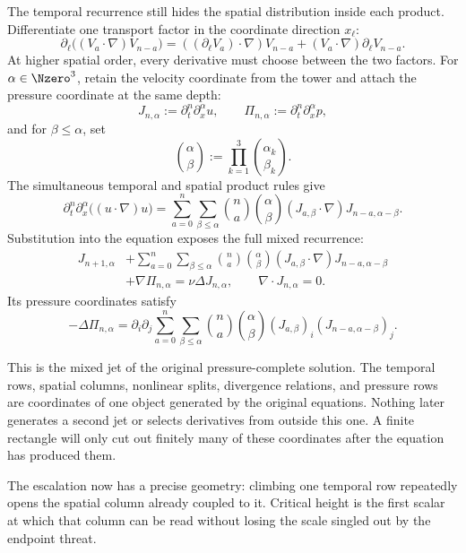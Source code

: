 The temporal recurrence still hides the spatial distribution inside each product.
Differentiate one transport factor in the coordinate direction \(x_\ell\):
\[
  \partial_\ell\bigl((V_a\cdot\nabla)V_{n-a}\bigr)
  =
  ((\partial_\ell V_a)\cdot\nabla)V_{n-a}
  +(V_a\cdot\nabla)\partial_\ell V_{n-a}.
\]
At higher spatial order, every derivative must choose between the two factors.
For \(\alpha\in\Nzero^3\), retain the velocity coordinate from the tower and attach the pressure coordinate at the same depth:
\[
  J_{n,\alpha}
  :=
  \partial_t^n\partial_x^\alpha u,
  \qquad
  \Pi_{n,\alpha}
  :=
  \partial_t^n\partial_x^\alpha p,
\]
and for \(\beta\le\alpha\), set
\[
  \binom{\alpha}{\beta}
  :=
  \prod_{k=1}^{3}\binom{\alpha_k}{\beta_k}.
\]
The simultaneous temporal and spatial product rules give
\[
  \partial_t^n\partial_x^\alpha\bigl((u\cdot\nabla)u\bigr)
  =
  \sum_{a=0}^{n}
  \sum_{\beta\le\alpha}
  \binom{n}{a}
  \binom{\alpha}{\beta}
  (J_{a,\beta}\cdot\nabla)
  J_{n-a,\alpha-\beta}.
\]
Substitution into the equation exposes the full mixed recurrence:
\begin{align*}
  J_{n+1,\alpha}
  &+
  \sum_{a=0}^{n}
  \sum_{\beta\le\alpha}
  \binom{n}{a}
  \binom{\alpha}{\beta}
  (J_{a,\beta}\cdot\nabla)
  J_{n-a,\alpha-\beta}
  \\
  &+\nabla\Pi_{n,\alpha}
  =
  \nu\Delta J_{n,\alpha},
  \qquad
  \nabla\cdot J_{n,\alpha}=0.
\end{align*}
Its pressure coordinates satisfy
\[
  -\Delta\Pi_{n,\alpha}
  =
  \partial_i\partial_j
  \sum_{a=0}^{n}
  \sum_{\beta\le\alpha}
  \binom{n}{a}
  \binom{\alpha}{\beta}
  (J_{a,\beta})_i
  (J_{n-a,\alpha-\beta})_j.
\]

This is the mixed jet of the original pressure-complete solution.
The temporal rows, spatial columns, nonlinear splits, divergence relations, and pressure rows are coordinates of one object generated by the original equations.
Nothing later generates a second jet or selects derivatives from outside this one.
A finite rectangle will only cut out finitely many of these coordinates after the equation has produced them.

The escalation now has a precise geometry: climbing one temporal row repeatedly opens the spatial column already coupled to it.
Critical height is the first scalar at which that column can be read without losing the scale singled out by the endpoint threat.
